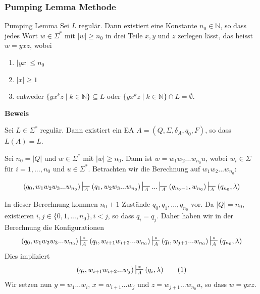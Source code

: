 \documentclass[a4paper, 11pt]{article}
\def\N{\mathbb{N}}
\begin{document}
    \subsubsection{Pumping Lemma Methode}
    \begin{mainbox}{Pumping Lemma}
        Sei $L$ regulär. Dann existiert eine Konstante $n_0 \in \N$, so dass jedes Wort $w \in \Sigma^*$ mit $|w| \geq n_0$ in drei Teile $x, y$ und $z$ zerlegen lässt, das heisst $w = yxz$, wobei
        \begin{enumerate}[label=(\roman*)]
            \item $|yx| \leq n_0$
            \item $|x| \geq 1$
            \item entweder $\{yx^kz \mid k \in \N\} \subseteq L$ oder $\{yx^kz \mid k \in \N\} \cap L = \emptyset$.
        \end{enumerate}
    \end{mainbox}
    
    \textbf{Beweis}

    Sei $L \in \Sigma^*$ regulär. Dann existiert ein EA $A= (Q, \Sigma, \delta_A, q_0, F)$, so dass $L(A) = L$.
    
    Sei $n_0 = |Q|$ und $w \in \Sigma^*$ mit $|w| \geq n_0$. Dann ist $w = w_1w_2...w_{n_0}u$, wobei $w_i \in \Sigma$ für $i = 1, ..., n_0$ und $u \in \Sigma^*$. Betrachten wir die Berechnung auf $w_1w_2...w_{n_0}$:

    $$(q_0, w_1w_2w_3...w_{n_0}) \sststile{A}{} (q_1, w_2w_3...w_{n_0}) \sststile{A}{} ... \sststile{A}{} (q_{n_0-1}, w_{n_0}) \sststile{A}{} (q_{n_0}, \lambda)$$

    In dieser Berechnung kommen $n_0 + 1$ Zustände $q_0,q_1, ..., q_{n_0}$ vor. Da $|Q| = n_0$, existieren $i, j \in \{0, 1, ..., n_0\}, i < j$, so dass $q_i = q_j$. Daher haben wir in der Berechnung die Konfigurationen
    $$(q_0, w_1w_2w_3...w_{n_0}) \sststile{A}{*} (q_i, w_{i+1}w_{i+2}...w_{n_0}) \sststile{A}{*} (q_i, w_{j+1}...w_{n_0}) \sststile{A}{*} (q_{n_0}, \lambda)$$
    Dies impliziert
    $$(q_i, w_{i+1}w_{i+2}...w_j) \sststile{A}{*} (q_i, \lambda) \qquad (1)$$
    Wir setzen nun $y = w_1...w_i$, $x = w_{i+1}...w_j$ und $z = w_{j+1}...w_{n_0}u$, so dass $w = yxz$.
\end{document}
